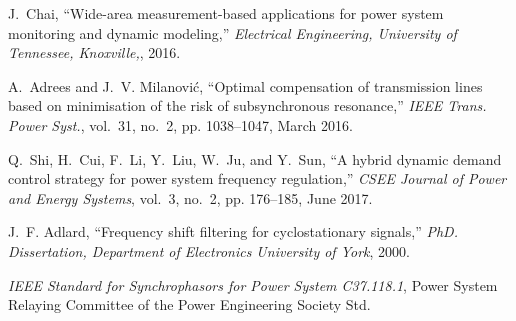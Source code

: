 \documentclass[journal,twoside]{IEEEtran}
\begin{document}
\begin{thebibliography}{10}
	J.~Chai, ``Wide-area measurement-based applications for power system monitoring
	and dynamic modeling,'' \emph{Electrical Engineering, University of
		Tennessee, Knoxville,}, 2016.
	
	A.~Adrees and J.~V. Milanović, ``Optimal compensation of transmission lines
	based on minimisation of the risk of subsynchronous resonance,'' \emph{IEEE
		Trans. Power Syst.}, vol.~31, no.~2, pp. 1038--1047, March 2016.
	
	Q.~Shi, H.~Cui, F.~Li, Y.~Liu, W.~Ju, and Y.~Sun, ``A hybrid dynamic demand
	control strategy for power system frequency regulation,'' \emph{CSEE Journal
		of Power and Energy Systems}, vol.~3, no.~2, pp. 176--185, June 2017.
	
	J.~F. Adlard, ``Frequency shift filtering for cyclostationary signals,''
	\emph{PhD. Dissertation, Department of Electronics University of York}, 2000.
	
	\emph{IEEE Standard for Synchrophasors for Power System C37.118.1}, Power
	System Relaying Committee of the Power Engineering Society Std.
	
\end{thebibliography}
\end{document}
